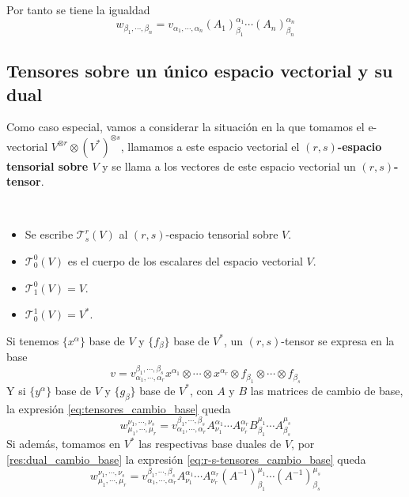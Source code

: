 Por tanto se tiene la igualdad
\begin{equation}
  \label{eq:tensores_cambio_base}
  w_{\beta_1,\cdots,\beta_n}=v_{\alpha_1,\cdots,\alpha_n}(A_1)^{\alpha_1}_{\beta_1}\cdots (A_n)^{\alpha_n}_{\beta_n}
\end{equation}

\subsection{Tensores sobre un único espacio vectorial y su dual}\label{subsec:tensores-sobre-un-único-espacio-vectorial-y-su-dual}
Como caso especial, vamos a considerar la situación en la que tomamos el e-vectorial
$V^{\otimes r}\otimes (V^*)^{\otimes s}$, llamamos a este espacio vectorial el \textbf{$(r,s)$-espacio tensorial sobre $V$}
y se llama a los vectores de este espacio vectorial un \textbf{$(r,s)$-tensor}.
\begin{notation}
  \
  \begin{itemize}
    \item Se escribe $\mathcal{T}^r_s(V)$ al $(r,s)$-espacio tensorial sobre $V$.
    \item $\mathcal{T}^0_0(V)$ es el cuerpo de los escalares del espacio vectorial $V$.
    \item $\mathcal{T}^0_1(V) = V$.
    \item $\mathcal{T}^1_0(V)=V^*$.
  \end{itemize}
\end{notation}

Si tenemos $\{x^\alpha\}$ base de $V$ y $\{f_\beta\}$ base de $V^*$, un $(r,s)$-tensor se expresa en la base
\begin{equation}
  \label{eq:r-s-tensor-componentes}
  v=v_{\alpha_1,\cdots,\alpha_r}^{\beta_1,\cdots, \beta_s} x^{\alpha_1}\otimes\cdots\otimes x^{\alpha_r}\otimes f_{\beta_1}\otimes\cdots\otimes f_{\beta_s}
\end{equation}
Y si $\{y^\alpha\}$ base de $V$ y $\{g_\beta\}$ base de $V^*$, con $A$ y $B$ las matrices de cambio de base, la expresión \ref{eq:tensores_cambio_base}
queda
\begin{equation}
  \label{eq:r-s-tensores_cambio_base}
  w_{\mu_1,\cdots,\mu_r}^{\nu_1,\cdots, \nu_s}=v_{\alpha_1,\cdots,\alpha_r}^{\beta_1,\cdots, \beta_s}A^{\alpha_1}_{\nu_1}\cdots A^{\alpha_r}_{\nu_r}B_{\beta_1}^{\mu_1}\cdots A_{\beta_s}^{\mu_s}
\end{equation}
Si además, tomamos en $V^*$ las respectivas base duales de $V$, por \ref{res:dual_cambio_base} la expresión \ref{eq:r-s-tensores_cambio_base}
queda
\begin{equation}
  \label{eq:r-s-tensores_cambio_base_dual}
  w_{\mu_1,\cdots,\mu_r}^{\nu_1,\cdots, \nu_s}=v_{\alpha_1,\cdots,\alpha_r}^{\beta_1,\cdots, \beta_s}A^{\alpha_1}_{\nu_1}\cdots A^{\alpha_r}_{\nu_r}(A^{-1})_{\beta_1}^{\mu_1}\cdots (A^{-1})_{\beta_s}^{\mu_s}
\end{equation}